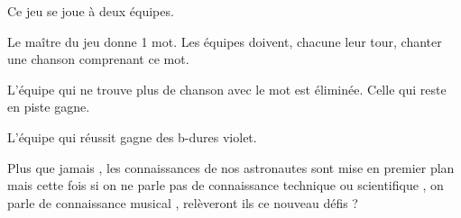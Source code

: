 \documentclass{grand-jeu}
\begin{document}
\begin{regles}
Ce jeu se joue à deux équipes.

Le maître du jeu donne 1 mot. Les équipes doivent, chacune leur tour, chanter une chanson comprenant ce mot.

L’équipe qui ne trouve plus de chanson avec le mot est éliminée. Celle qui reste en piste gagne.

L'équipe qui réussit gagne des b-dures violet. 
\end{regles}

\begin{imaginaire}
Plus que jamais , les connaissances de nos astronautes sont mise en premier plan mais cette fois si on ne parle pas de connaissance technique ou scientifique , on parle de connaissance musical , relèveront ils ce nouveau défis ?

\end{imaginaire}

\begin{moments-stop}
\end{moments-stop}
\end{document}
